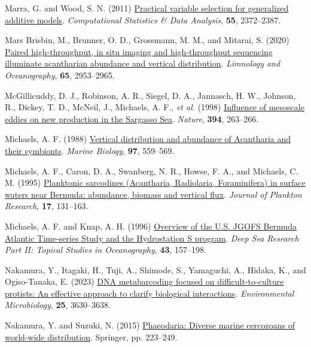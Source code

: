 \documentclass[
]{article}
\newlength{\cslhangindent}
\newenvironment{CSLReferences}[2] %
 {\begin{list}{}{%
  \setlength{\itemindent}{0pt}
  \setlength{\leftmargin}{0pt}
  \setlength{\parsep}{0pt}
  \ifodd #1
   \setlength{\leftmargin}{\cslhangindent}
   \setlength{\itemindent}{-1\cslhangindent}
  \fi
  \setlength{\itemsep}{#2\baselineskip}}}
 {\end{list}}
\begin{document}
\begin{CSLReferences}{1}{0}
Marra, G. and Wood, S. N. (2011)
\href{https://doi.org/10.1016/j.csda.2011.02.004}{Practical variable
selection for generalized additive models}. \emph{Computational
Statistics \& Data Analysis}, \textbf{55}, 2372--2387.

Mars Brisbin, M., Brunner, O. D., Grossmann, M. M., and Mitarai, S.
(2020) \href{https://doi.org/10.1002/lno.11567}{Paired high-throughput,
in situ imaging and high-throughput sequencing illuminate acantharian
abundance and vertical distribution}. \emph{Limnology and Oceanography},
\textbf{65}, 2953--2965.

McGillicuddy, D. J., Robinson, A. R., Siegel, D. A., Jannasch, H. W.,
Johnson, R., Dickey, T. D., McNeil, J., Michaels, A. F., \emph{et al.}
(1998) \href{https://doi.org/10.1038/28367}{Influence of mesoscale
eddies on new production in the Sargasso Sea}. \emph{Nature},
\textbf{394}, 263--266.

Michaels, A. F. (1988)
\href{https://doi.org/10.1007/BF00391052}{Vertical distribution and
abundance of Acantharia and their symbionts}. \emph{Marine Biology},
\textbf{97}, 559--569.

Michaels, A. F., Caron, D. A., Swanberg, N. R., Howse, F. A., and
Michaels, C. M. (1995)
\href{https://doi.org/10.1093/plankt/17.1.131}{Planktonic sarcodines
(Acantharia, Radiolaria, Foraminifera) in surface waters near Bermuda:
abundance, biomass and vertical flux}. \emph{Journal of Plankton
Research}, \textbf{17}, 131--163.

Michaels, A. F. and Knap, A. H. (1996)
\href{https://doi.org/10.1016/0967-0645(96)00004-5}{Overview of the U.S.
JGOFS Bermuda Atlantic Time-series Study and the Hydrostation S
program}. \emph{Deep Sea Research Part II: Topical Studies in
Oceanography}, \textbf{43}, 157--198.

Nakamura, Y., Itagaki, H., Tuji, A., Shimode, S., Yamaguchi, A., Hidaka,
K., and Ogiso-Tanaka, E. (2023)
\href{https://doi.org/10.1111/1462-2920.16524}{DNA metabarcoding focused
on difficult-to-culture protists: An effective approach to clarify
biological interactions}. \emph{Environmental Microbiology},
\textbf{25}, 3630--3638.

Nakamura, Y. and Suzuki, N. (2015)
\href{https://link.springer.com/chapter/10.1007/978-4-431-55130-0_9}{Phaeodaria:
Diverse marine cercozoans of world-wide distribution}. Springer, pp.
223--249.


\end{CSLReferences}
\end{document}
